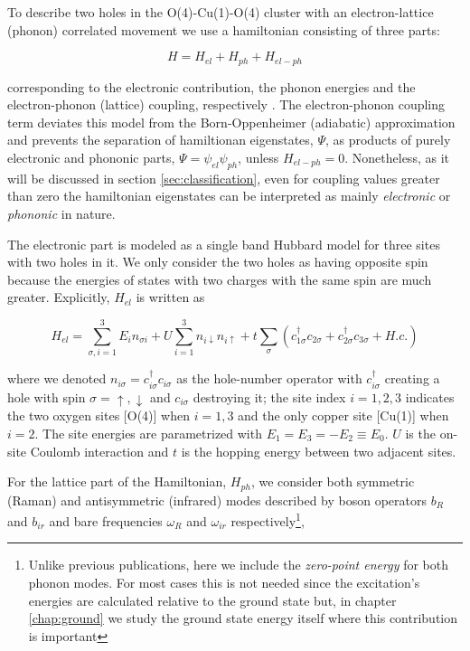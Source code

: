 To describe two holes in the O(4)-Cu(1)-O(4) cluster with an electron-lattice (phonon) correlated movement we use a hamiltonian consisting of three parts:

\begin{equation}
  \label{eq:full-hamiltonian}
  H = H_{el} + H_{ph} + H_{el-ph}
\end{equation}

\noindent corresponding to the electronic contribution, the phonon energies and the electron-phonon (lattice) coupling, respectively \cite{Salkola1994}. 
The electron-phonon coupling term deviates this model from the Born-Oppenheimer (adiabatic) approximation and prevents the separation of hamiltionan eigenstates, $\Psi$, as products of purely electronic and phononic parts, $\Psi=\psi_{el}\psi_{ph}$, unless $H_{el-ph}=0$.
Nonetheless, as it will be discussed in section \ref{sec:classification}, even for coupling values greater than zero the hamiltonian eigenstates can be interpreted as mainly \textit{electronic} or \textit{phononic} in nature.

The electronic part is modeled as a single band Hubbard model for three sites with two holes in it. 
We only consider the two holes as having opposite spin because the energies of states with two charges with the same spin are much greater.
Explicitly, $H_{el}$ is written as

\begin{equation}
  \label{eq:electronic-part}
  H_{el} = \sum_{\sigma,i=1}^3 E_i n_{\sigma i} 
        + U\sum_{i=1}^3 n_{i\downarrow}n_{i\uparrow} 
        + t\sum_{\sigma} \left(c_{1\sigma}^\dagger c_{2\sigma} + c_{2\sigma}^\dagger c_{3\sigma} + H.c. \right)
\end{equation}

\noindent where we denoted $n_{i\sigma}=c_{i\sigma}^\dagger c_{i\sigma}$ as the hole-number operator with $c_{i\sigma}^\dagger$ creating a hole with spin $\sigma = \uparrow, \downarrow$ and $c_{i\sigma}$ destroying it; the site index $i=1,2,3$ indicates the two oxygen sites [O(4)] when  $i=1,3$ and the only copper site [Cu(1)] when $i=2$. 
The site energies are parametrized with $E_1=E_3=-E_2 \equiv E_0$. 
$U$ is the on-site Coulomb interaction and $t$ is the hopping energy between two adjacent sites. 

For the lattice  part of the Hamiltonian, $H_{ph}$, we consider both symmetric (Raman) and antisymmetric (infrared) modes described by boson operators $b_R$ and $b_{ir}$ and bare frequencies $\omega_R$ and $\omega_{ir}$ respectively\footnote{Unlike previous publications, here we include the \textit{zero-point energy} for both phonon modes. 
For most cases this is not needed since the excitation's energies are calculated relative to the ground state but, in chapter \ref{chap:ground} we study the ground state energy itself where this contribution is important},

